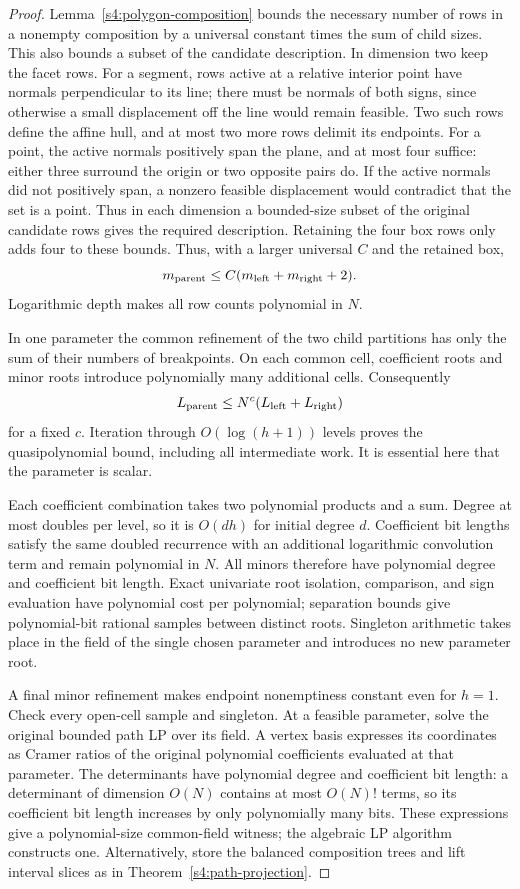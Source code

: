 \begin{proof}
Lemma~\ref{s4:polygon-composition} bounds the necessary number of rows
in a nonempty composition by a universal constant times the sum of
child sizes. This also bounds a subset of the candidate description.
In dimension two keep the facet rows. For a segment, rows active at a
relative interior point have normals perpendicular to its line; there
must be normals of both signs, since otherwise a small displacement
off the line would remain feasible. Two such rows define the affine
hull, and at most two more rows delimit its endpoints. For a point,
the active normals positively span the plane, and at most four suffice:
either three surround the origin or two opposite pairs do. If the
active normals did not positively span, a nonzero feasible displacement
would contradict that the set is a point. Thus in each dimension a
bounded-size subset of the original candidate rows gives the required
description. Retaining the four box rows only adds four to these bounds.
Thus, with a larger universal $C$ and the retained box,
\[
 m_{\rm parent}\le C(m_{\rm left}+m_{\rm right}+2).
\]
Logarithmic depth makes all row counts polynomial in $N$.

In one parameter the common refinement of the two child partitions has
only the sum of their numbers of breakpoints. On each common cell,
coefficient roots and minor roots introduce polynomially many additional
cells. Consequently
\[
 L_{\rm parent}\le N^c(L_{\rm left}+L_{\rm right})
\]
for a fixed $c$. Iteration through $O(\log(h+1))$ levels proves the
quasipolynomial bound, including all intermediate work. It is essential
here that the parameter is scalar.

Each coefficient combination takes two polynomial products and a sum.
Degree at most doubles per level, so it is $O(dh)$ for initial degree
$d$. Coefficient bit lengths satisfy the same doubled recurrence with an
additional logarithmic convolution term and remain polynomial in $N$.
All minors therefore have polynomial degree and coefficient bit length. Exact univariate
root isolation, comparison, and sign evaluation have polynomial cost
per polynomial; separation bounds give polynomial-bit rational samples
between distinct roots. Singleton arithmetic takes place in the field
of the single chosen parameter and introduces no new parameter root.

A final minor refinement makes endpoint nonemptiness constant even for
$h=1$. Check every open-cell sample and singleton. At a feasible
parameter, solve the original bounded path LP over its field. A vertex
basis expresses its coordinates as Cramer ratios of the original
polynomial coefficients evaluated at that parameter. The determinants
have polynomial degree and coefficient bit length: a determinant of dimension $O(N)$
contains at most $O(N)!$ terms, so its coefficient bit length increases by
only polynomially many bits. These expressions give a polynomial-size
common-field witness; the algebraic LP algorithm constructs one.
Alternatively, store the balanced composition trees and lift interval
slices as in Theorem~\ref{s4:path-projection}.
\end{proof}

